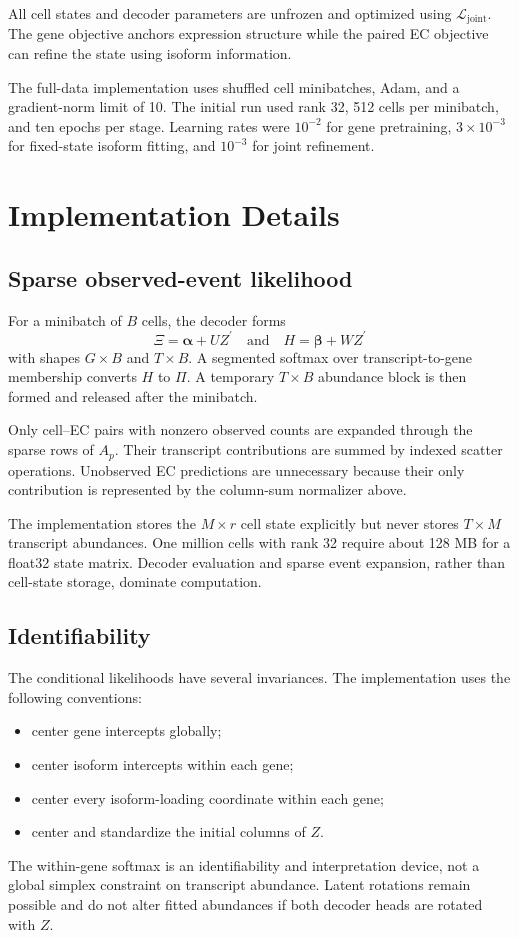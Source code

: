 \documentclass[11pt]{article}
\begin{document}
All cell states and decoder parameters are unfrozen and optimized using
\(\mathcal L_{\mathrm{joint}}\). The gene objective anchors expression
structure while the paired EC objective can refine the state using isoform
information.

The full-data implementation uses shuffled cell minibatches, Adam, and a
gradient-norm limit of 10. The initial run used rank 32, 512 cells per
minibatch, and ten epochs per stage. Learning rates were \(10^{-2}\) for gene
pretraining, \(3\times10^{-3}\) for fixed-state isoform fitting, and
\(10^{-3}\) for joint refinement.

\section*{Implementation Details}

\subsection*{Sparse observed-event likelihood}

For a minibatch of \(B\) cells, the decoder forms
\[
  \Xi=\bm\alpha+UZ^\prime
  \quad\text{and}\quad
  H=\bm\beta+WZ^\prime
\]
with shapes \(G\times B\) and \(T\times B\). A segmented softmax over
transcript-to-gene membership converts \(H\) to \(\Pi\). A temporary
\(T\times B\) abundance block is then formed and released after the
minibatch.

Only cell--EC pairs with nonzero observed counts are expanded through the
sparse rows of \(A_p\). Their transcript contributions are summed by indexed
scatter operations. Unobserved EC predictions are unnecessary because their
only contribution is represented by the column-sum normalizer above.

The implementation stores the \(M\times r\) cell state explicitly but never
stores \(T\times M\) transcript abundances. One million cells with rank 32
require about 128 MB for a float32 state matrix. Decoder evaluation and sparse
event expansion, rather than cell-state storage, dominate computation.

\subsection*{Identifiability}

The conditional likelihoods have several invariances. The implementation
uses the following conventions:
\begin{itemize}[leftmargin=*]
  \item center gene intercepts globally;
  \item center isoform intercepts within each gene;
  \item center every isoform-loading coordinate within each gene;
  \item center and standardize the initial columns of \(Z\).
\end{itemize}
The within-gene softmax is an identifiability and interpretation device, not a
global simplex constraint on transcript abundance. Latent rotations remain
possible and do not alter fitted abundances if both decoder heads are rotated
with \(Z\).
\end{document}
